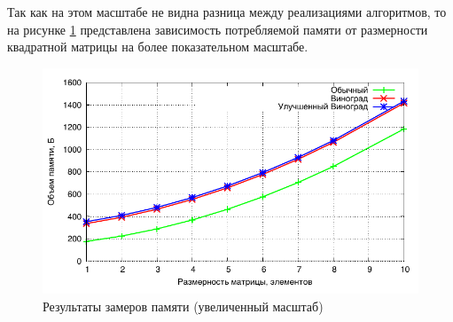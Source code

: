 Так как на этом масштабе не видна разница между реализациями алгоритмов, то на рисунке \ref{img:memory_detail} представлена зависимость потребляемой памяти от размерности квадратной матрицы на более показательном масштабе.

\noindent
\begin{figure}[h!]
	\centering
    \includegraphics[width=0.75\linewidth]{../data/memory_detail.pdf}
    \caption{Результаты замеров памяти (увеличенный масштаб)}
    \label{img:memory_detail}
\end{figure}

\newpage